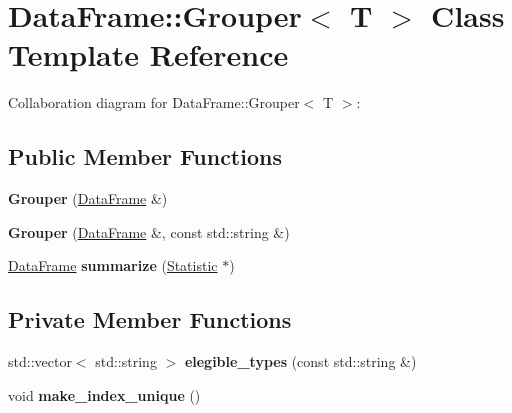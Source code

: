 \hypertarget{classDataFrame_1_1Grouper}{}\section{Data\+Frame\+:\+:Grouper$<$ T $>$ Class Template Reference}
\label{classDataFrame_1_1Grouper}


Collaboration diagram for Data\+Frame\+:\+:Grouper$<$ T $>$\+:
\subsection*{Public Member Functions}
\begin{DoxyCompactItemize}
\item 
\mbox{\label{classDataFrame_1_1Grouper_a474177da006d9ba18bd4bf2fd3809dd4}} 
{\bfseries Grouper} (\hyperlink{classDataFrame}{Data\+Frame} \&)
\item 
\mbox{\label{classDataFrame_1_1Grouper_aaf8d3173c0d890c3ac082adf2bb1f400}} 
{\bfseries Grouper} (\hyperlink{classDataFrame}{Data\+Frame} \&, const std\+::string \&)
\item 
\mbox{\label{classDataFrame_1_1Grouper_a364e765427d5268d8ab515341dcb02b1}} 
\hyperlink{classDataFrame}{Data\+Frame} {\bfseries summarize} (\hyperlink{classStatistic}{Statistic} $\ast$)
\end{DoxyCompactItemize}
\subsection*{Private Member Functions}
\begin{DoxyCompactItemize}
\item 
\mbox{\label{classDataFrame_1_1Grouper_a2e806e00d5c98346dfdfb01a61651ae6}} 
std\+::vector$<$ std\+::string $>$ {\bfseries elegible\+\_\+types} (const std\+::string \&)
\item 
\mbox{\label{classDataFrame_1_1Grouper_aa8519a3b8eb2c8fa471a2de09516ba9e}} 
void {\bfseries make\+\_\+index\+\_\+unique} ()
\end{DoxyCompactItemize}

